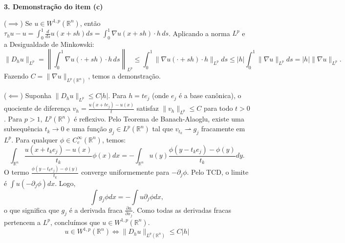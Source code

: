 \documentclass[cs_edp_2026.1.tex]{subfiles} %
\begin{document}
{	\textbf{3. Demonstração do item (c)}
	
	($\implies$) Se $u \in W^{1,p}(\mathbb{R}^n)$, então $\tau_h u - u = \int_0^1 \frac{d}{ds} u(x+sh) ds = \int_0^1 \nabla u(x+sh) \cdot h \, ds$.
	Aplicando a norma $L^p$ e a Desigualdade de Minkowski:
	$$\|D_h u\|_{L^p} = \left\| \int_0^1 \nabla u(\cdot+sh) \cdot h \, ds \right\|_{L^p} \leq \int_0^1 \|\nabla u(\cdot+sh) \cdot h\|_{L^p} ds \leq |h| \int_0^1 \|\nabla u\|_{L^p} ds = |h| \|\nabla u\|_{L^p}.$$
	Fazendo $C = \|\nabla u\|_{L^p(\mathbb{R}^n)}$, temos a demonstração.
	
	($\impliedby$) Suponha $\|D_h u\|_{L^p} \leq C|h|$. Para $h = te_j$ (onde $e_j$ é a base canônica), o quociente de diferença $v_{h} = \tfrac{u(x+te_j) - u(x)}{t}$ satisfaz $\|v_h\|_{L^p} \leq C$ para todo $t > 0$. 
	Para $p > 1$, $L^p(\mathbb{R}^n)$ é reflexivo. Pelo Teorema de Banach-Alaoglu, existe uma subsequência $t_k \to 0$ e uma função $g_j \in L^p(\mathbb{R}^n)$ tal que $v_{t_k} \rightharpoonup g_j$ fracamente em $L^p$. 
	Para qualquer $\phi \in C_c^\infty(\mathbb{R}^n)$, temos:
	$$\int_{\mathbb{R}^n} \frac{u(x+t_k e_j) - u(x)}{t_k} \phi(x) dx = - \int_{\mathbb{R}^n} u(y) \frac{\phi(y-t_k e_j) - \phi(y)}{t_k} dy.$$
	O termo $\tfrac{\phi(y-t_k e_j) - \phi(y)}{t_k}$ converge uniformemente para $-\partial_j \phi$. Pelo TCD, o limite é $\int u (-\partial_j \phi) dx$. Logo, 
	$$\int g_j \phi dx = - \int u \partial_j \phi dx,$$ o que significa que $g_j$ é a derivada fraca $\frac{\partial u}{\partial x_j}$. Como todas as derivadas fracas pertencem a $L^p$, concluímos que $u \in W^{1,p}(\mathbb{R}^n)$.
	$$\boxed{u \in W^{1,p}(\mathbb{R}^n) \iff \|D_h u\|_{L^p(\mathbb{R}^n)} \leq C|h|}$$
}


\end{document}
